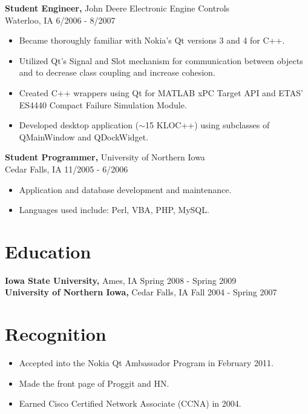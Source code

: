 \documentclass[margin]{res}
\begin{document}
\begin{resume}
{\bf Student Engineer,} John Deere Electronic Engine Controls\\ Waterloo, IA \hfill 6/2006 - 8/2007
\begin{itemize} \itemsep -2pt  %
\item Became thoroughly familiar with Nokia's Qt versions 3 and 4 for C++.
\item Utilized Qt's Signal and Slot mechanism for communication between objects and to decrease class coupling and increase cohesion.
\item Created C++ wrappers using Qt for MATLAB xPC Target API and ETAS' ES4440 Compact Failure Simulation Module.
\item Developed desktop application ($\sim$15 KLOC++) using subclasses of QMainWindow and QDockWidget.
\end{itemize}
 
{\bf Student Programmer,} University of Northern Iowa\\ Cedar Falls, IA \hfill 11/2005 - 6/2006
\begin{itemize} \itemsep -2pt  %
\item Application and database development and maintenance.
\item Languages used include: Perl, VBA, PHP, MySQL.
\end{itemize}


\section{Education} 
{\bf Iowa State University,} Ames, IA \hfill Spring 2008 - Spring 2009 \\
{\bf University of Northern Iowa,} Cedar Falls, IA \hfill Fall 2004 - Spring 2007

\section{Recognition}
\begin{itemize} \itemsep -2pt  %
\item Accepted into the Nokia Qt Ambassador Program in February 2011.
\item Made the front page of Proggit and HN.
\item Earned Cisco Certified Network Associate (CCNA) in 2004.
\end{itemize}


\end{resume}
\end{document}
